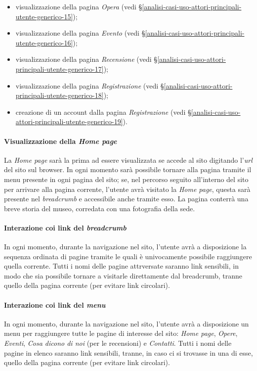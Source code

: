 \begin{itemize}
	\item visualizzazione della pagina \textit{Opera} (vedi §\ref{analisi-casi-uso-attori-principali-utente-generico-15});
	\item visualizzazione della pagina \textit{Evento} (vedi §\ref{analisi-casi-uso-attori-principali-utente-generico-16});
	\item visualizzazione della pagina \textit{Recensione} (vedi §\ref{analisi-casi-uso-attori-principali-utente-generico-17});
	\item visualizzazione della pagina \textit{Registrazione} (vedi §\ref{analisi-casi-uso-attori-principali-utente-generico-18});
	\item creazione di un account dalla pagina \textit{Registrazione} (vedi §\ref{analisi-casi-uso-attori-principali-utente-generico-19}).
\end{itemize}

\paragraph{Visualizzazione della \textit{Home page}}
\label{analisi-casi-uso-attori-principali-utente-generico-1}
La \textit{Home page} sarà la prima ad essere visualizzata se accede al sito digitando l'\textit{url} del sito sul browser. In ogni momento sarà possibile tornare alla pagina tramite il menu presente in ogni pagina del sito; se, nel percorso seguito all'interno del sito per arrivare alla pagina corrente, l'utente avrà visitato la \textit{Home page}, questa sarà presente nel \textit{breadcrumb} e accessibile anche tramite esso. La pagina conterrà una breve storia del museo, corredata con una fotografia della sede.

\paragraph{Interazione coi link del \textit{breadcrumb}}
\label{analisi-casi-uso-attori-principali-utente-generico-2}
In ogni momento, durante la navigazione nel sito, l'utente avrà a disposizione la sequenza ordinata di pagine tramite le quali è univocamente possibile raggiungere quella corrente. Tutti i nomi delle pagine attrversate saranno link sensibili, in modo che sia possibile tornare a visitarle direttamente dal breadcrumb, tranne quello della pagina corrente (per evitare link circolari).

\paragraph{Interazione coi link del \textit{menu}}
\label{analisi-casi-uso-attori-principali-utente-generico-3}
In ogni momento, durante la navigazione nel sito, l'utente avrà a disposizione un menu per raggiungere tutte le pagine di interesse del sito: \textit{Home page}, \textit{Opere}, \textit{Eventi}, \textit{Cosa dicono di noi} (per le recensioni) e \textit{Contatti}. Tutti i nomi delle pagine in elenco saranno link sensibili, tranne, in caso ci si trovasse in una di esse, quello della pagina corrente (per evitare link circolari).

